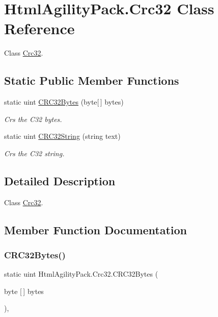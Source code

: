 \hypertarget{class_html_agility_pack_1_1_crc32}{}\section{Html\+Agility\+Pack.\+Crc32 Class Reference}
\label{class_html_agility_pack_1_1_crc32}


Class \hyperlink{class_html_agility_pack_1_1_crc32}{Crc32}.  


\subsection*{Static Public Member Functions}
\begin{DoxyCompactItemize}
\item 
static uint \hyperlink{class_html_agility_pack_1_1_crc32_aee8657264a2ba7f5e2967cd9efeaa1a0}{C\+R\+C32\+Bytes} (byte\mbox{[}$\,$\mbox{]} bytes)
\begin{DoxyCompactList}\small\item\em Crs the C32 bytes. \end{DoxyCompactList}\item 
static uint \hyperlink{class_html_agility_pack_1_1_crc32_af5d22a9bd82dfb2b9799f43e5a71be78}{C\+R\+C32\+String} (string text)
\begin{DoxyCompactList}\small\item\em Crs the C32 string. \end{DoxyCompactList}\end{DoxyCompactItemize}


\subsection{Detailed Description}
Class \hyperlink{class_html_agility_pack_1_1_crc32}{Crc32}. 



\subsection{Member Function Documentation}
\mbox{\label{class_html_agility_pack_1_1_crc32_aee8657264a2ba7f5e2967cd9efeaa1a0}} 
\subsubsection{\texorpdfstring{C\+R\+C32\+Bytes()}{CRC32Bytes()}}
{\footnotesize\ttfamily static uint Html\+Agility\+Pack.\+Crc32.\+C\+R\+C32\+Bytes (\begin{DoxyParamCaption}\item[{byte \mbox{[}$\,$\mbox{]}}]{bytes }\end{DoxyParamCaption})\hspace{0.3cm}{\ttfamily [inline]}, {\ttfamily [static]}}



